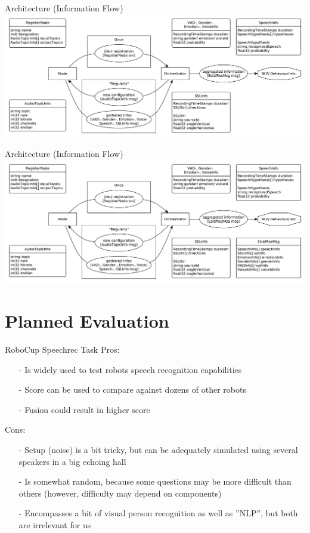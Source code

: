 \documentclass{beamer}
\begin{document}
	\begin{frame}{Architecture (Information Flow)}
		\centering
		\includegraphics[width=\textwidth]{Bilder/orchestrator_1}
	\end{frame}
	
	\begin{frame}{Architecture (Information Flow)}
		\centering
		\includegraphics[width=\textwidth]{Bilder/orchestrator_2}
	\end{frame}
	
	
	
	
	
	
	
	
	\section{Planned Evaluation}
	
	\begin{frame}{RoboCup Speechrec Task}
		\pause
		Pros:
		\begin{itemize}
			\item[-] Is widely used to test robots speech recognition capabilities
			\item[-] Score can be used to compare against dozens of other robots
			\item[-] Fusion could result in higher score
		\end{itemize}
		\pause
		Cons:
		\begin{itemize}
			\item[-] Setup (noise) is a bit tricky, but can be adequately simulated using several speakers in a big echoing hall
			\item[-] Is somewhat random, because some questions may be more difficult than others (however, difficulty may depend on components)
			\item[-] Encompasses a bit of visual person recognition as well as ''NLP'', but both are irrelevant for us
		\end{itemize}
	\end{frame}
	
\end{document}
